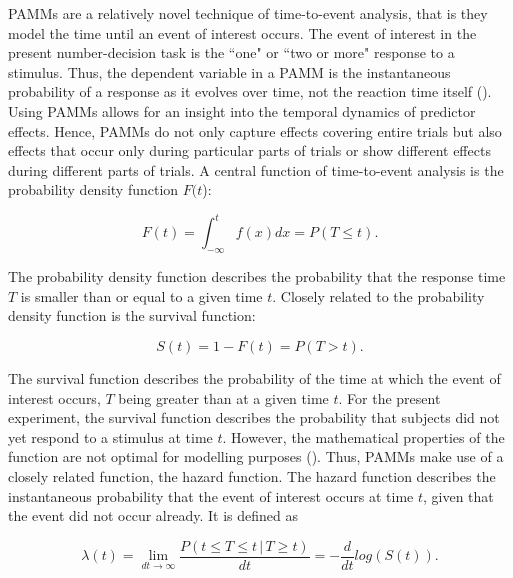 PAMMs are a relatively novel technique of time-to-event analysis, that is they model the time until an event of interest occurs. The event of interest in the present number-decision task is the ``one" or ``two or more" response to a stimulus. Thus, the dependent variable in a PAMM is the instantaneous probability of a response as it evolves over time, not the reaction time itself (\cite{Hendrix2020}). Using PAMMs allows for an insight into the temporal dynamics of predictor effects. Hence, PAMMs do not only capture effects covering entire trials but also effects that occur only during particular parts of trials or show different effects during different parts of trials. A central function of time-to-event analysis is the probability density function $F(t$):

\begin{equation}
\label{eq:Ft}
    F(t)=\int_{-\infty}^{t}f(x)dx=P(T\leq t).
\end{equation}

The probability density function describes the probability that the response time $T$ is smaller than or equal to a given time $t$. Closely related to the probability density function is the survival function:

\begin{equation}
\label{eq:St}
    S(t)=1-F(t)=P(T>t).
\end{equation}

The survival function describes the probability of the time at which the event of interest occurs, $T$ being greater than at a given time $t$. For the present experiment, the survival function describes the probability that subjects did not yet respond to a stimulus at time $t$. However, the mathematical properties of the function are not optimal for modelling purposes (\cite{Hendrix2020}). Thus, PAMMs make use of a closely related function, the hazard function. The hazard function describes the instantaneous probability that the event of interest occurs at time $t$, given that the event did not occur already. It is defined as

\begin{equation}
\label{eq:lambdat}
\lambda(t)=\lim \limits_{dt \to \infty}\frac{P(t\leq T\leq t\, |\, T\geq t)}{dt}=-\frac{d}{dt}log(S(t)).
\end{equation}

